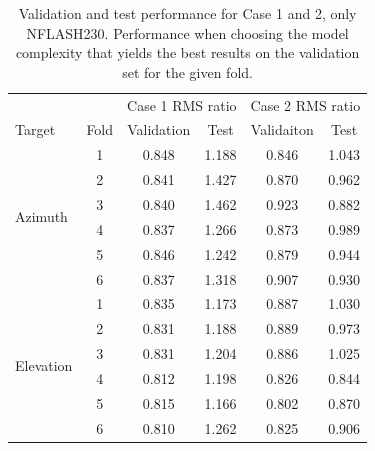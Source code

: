 \begin{table}[!htbp]
    \centering
    \caption{Validation and test performance for Case 1 and 2, only NFLASH230.
    Performance when choosing the model complexity that yields the best results on the validation set for the given fold.}
    \begin{tabular}{lccccc}
        \toprule
        & & \multicolumn{2}{c}{Case 1 RMS ratio} & \multicolumn{2}{c}{Case 2 RMS ratio} \\
        \cmidrule{3-4} \cmidrule{5-6}
        Target & Fold & Validation & Test &  Validaiton &  Test \\
        \midrule
        \multirow{6}{*}{Azimuth} & 1 &  0.848 &       1.188 &      0.846 &       1.043 \\
                            & 2 &  0.841 &       1.427 &      0.870 &       0.962 \\
                            & 3 &  0.840 &       1.462 &      0.923 &       0.882 \\
                            & 4 &  0.837 &       1.266 &      0.873 &       0.989 \\
                            & 5 &  0.846 &       1.242 &      0.879 &       0.944 \\
                            & 6 &  0.837 &       1.318 &      0.907 &       0.930 \\
        \hline
        \multirow{6}{*}{Elevation} & 1 &  0.835 &       1.173 &      0.887 &       1.030 \\
                            & 2 &  0.831 &       1.188 &      0.889 &       0.973 \\
                            & 3 &  0.831 &       1.204 &      0.886 &       1.025 \\
                            & 4 &  0.812 &       1.198 &      0.826 &       0.844 \\
                            & 5 &  0.815 &       1.166 &      0.802 &       0.870 \\
                            & 6 &  0.810 &       1.262 &      0.825 &       0.906 \\
        \bottomrule
    \end{tabular}
    \label{tab:results_minval_val_test_days_04_n230}
\end{table}

